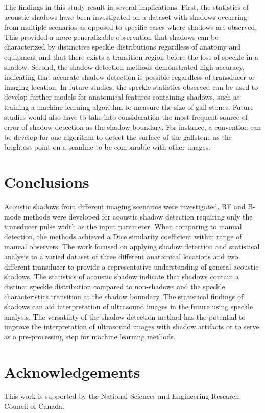\documentclass[preprint,5p,authoryear]{elsarticle}
\begin{document}
The findings in this study result in several implications. First, the statistics of acoustic shadows have been investigated on a dataset with shadows occurring from multiple scenarios as opposed to specific cases where shadows are observed. This provided a more generalizable observation that shadows can be characterized by distinctive speckle distributions regardless of anatomy and equipment and that there exists a transition region before the loss of speckle in a shadow. Second, the shadow detection methods demonstrated high accuracy, indicating that accurate shadow detection is possible regardless of transducer or imaging location. In future studies, the speckle statistics observed can be used to develop further models for anatomical features containing shadows, such as training a machine learning algorithm to measure the size of gall stones. Future studies would also have to take into consideration the most frequent source of error of shadow detection as the shadow boundary. For instance, a convention can be develop for one algorithm to detect the surface of the gallstone as the brightest point on a scanline to be comparable with other images.

\section*{Conclusions}
\label{Conclusions}
Acoustic shadows from different imaging scenarios were investigated. RF and B-mode methods were developed for acoustic shadow detection requiring only the transducer pulse width as the input parameter. When comparing to manual detection, the methods achieved a Dice similarity coefficient within range of manual observers. The work focused on applying shadow detection and statistical analysis to a varied dataset of three different anatomical locations and two different transducer to provide a representative understanding of general acoustic shadows. The statistics of acoustic shadow indicate that shadows contain a distinct speckle distribution compared to non-shadows and the speckle characteristics transition at the shadow boundary. The statistical findings of shadows can aid interpretation of ultrasound images in the future using speckle analysis. The versatility of the shadow detection method has the potential to improve the interpretation of ultrasound images with shadow artifacts or to serve as a pre-processing step for machine learning methods.

        
\section*{Acknowledgements}
\label{Ack}
This work is supported by the National Sciences and Engineering Research Council of Canada.
\end{document}
